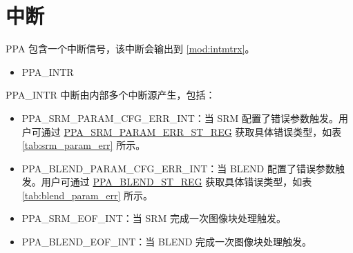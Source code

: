 \documentclass[main\_\_CN.tex]{subfiles}
\begin{document}

\section{中断}


\chipname{} PPA 包含一个中断信号，该中断会输出到 \ref{mod:intmtrx}\textit{}。

    \begin{itemize}
        \item PPA\_INTR
    \end{itemize}

PPA\_INTR 中断由内部多个中断源产生，包括：
\begin{itemize}
    \item \label{int:PPASRMPARAMCFGERR}PPA\_SRM\_PARAM\_CFG\_ERR\_INT：当 SRM 配置了错误参数触发。用户可通过 \hyperref[regdesc:PPASRMPARAMERRSTREG]{PPA\_SRM\_PARAM\_ERR\_ST\_REG} 获取具体错误类型，如表 \ref{tab:srm_param_err} 所示。
    \item \label{int:PPABLENDPARAMCFGERR}PPA\_BLEND\_PARAM\_CFG\_ERR\_INT：当 BLEND 配置了错误参数触发。用户可通过 \hyperref[regdesc:PPABLENDSTREG]{PPA\_BLEND\_ST\_REG} 获取具体错误类型，如表 \ref{tab:blend_param_err} 所示。
    \item \label{int:PPASRMEOF}PPA\_SRM\_EOF\_INT：当 SRM 完成一次图像块处理触发。
    \item \label{int:PPABLENDEOF}PPA\_BLEND\_EOF\_INT：当 BLEND 完成一次图像块处理触发。
\end{itemize}
\end{document}
